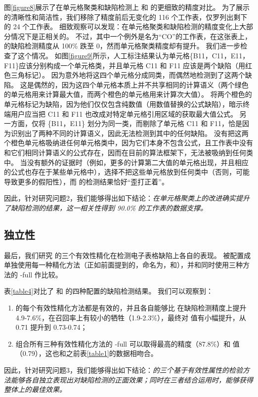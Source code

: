 图\ref{figure8}展示了在单元格聚类和缺陷检测上 \wa 和 \cu 的更细致的精度对比。
为了展示的清晰性和简洁性，我们移除了精度前后无变化的 116 个工作表，仅罗列出剩下的 24 个工作表。
细致观察可以发现：在单元格聚类和缺陷检测的精度变化上大部分情况下是正相关的。
不过，其中一个例外是名为“CO”的工作表，在这张表上，\wa 的缺陷检测精度从 100\% 跌至 0，然而单元格聚类精度却有提升。
我们进一步检查了这个情况。
如图\ref{figure9}所示，人工标注结果认为单元格\{B11，C11，E11，F11\}应该分别构成一个单元格类，并且单元格 C11 和 F11 应该是两个缺陷（用红色三角标记）。
\cu 因为意外地将这四个单元格分成同类，而偶然地检测到了这两个缺陷。
这是偶然的，因为这四个单元格本质上并不共享相同的计算语义（两个绿色的单元格用来计算最大值，而两个橙色的单元格用来计算次大值）。
\cu 将两个橙色的单元格标记为缺陷，因为他们仅仅包含纯数值（用数值替换的公式缺陷），暗示终端用户应当把 C11 和 F11 也改成对特定单元格引用区域的获取最大值公式。
另一方面，\wa 仅将 \{B11，E11\} 划分为同一类，而剔除了单元格 C11 和 F11，恰是因为识别出了两种不同的计算语义，因此无法检测到其中的任何缺陷。
\wa 没有把这两个橙色单元格吸纳进任何单元格类中，因为它们本身不包含公式，且工作表中没有和它们相同计算语义的公式存在，因而在目前的算法框架下，无法被吸纳到任何类中。
当没有额外的证据时（例如，更多的计算第二大值的单元格出现，并且相应的公式也存在于某些单元格中），\wa 选择不把这些单元格放到任何类中（否则，可能导致更多的假阳性），而 \cu 的检测结果恰好“歪打正着”。

因此，针对研究问题2，我们能够得出如下结论：\textit{\wa 在单元格聚类上的改进确实提升了缺陷检测的结果，这一相关性得到 90.0\% 的工作表的数据支撑。}

\subsection{独立性}

最后，我们研究 \wa 的三个有效性精化在检测电子表格缺陷上各自的表现。
\wa 被配置成单独使用每一种精化方法（正如前面提到的，命名为\wasc，\wamc 和\wawc ），并和同时使用三种方法的 \wa-full 作比较。

表\ref{table4}对比了 \cu 和 \wa 的四种配置的缺陷检测结果。
我们可以观察到：
\begin{enumerate}
    \item \wa 的每个有效性精化方法都是有效的，并且各自能够比 \cu 在缺陷检测精度上提升 4.9-7.6\%，在召回率上有较小的牺牲（1.9-2.3\%），最终对 \fmd 值有小幅提升，从 0.71 提升到 0.73-0.74；
    \item 组合所有三种有效性精化方法的 \wa-full 可以取得最高的精度（87.8\%）和 \fmd 值（0.79），这也和之前表\ref{table1}的数据相吻合。
\end{enumerate}

因此，针对研究问题3，我们能够得出如下结论：\textit{\wa 的三个基于有效性属性的检验方法能够各自独立表现出对缺陷检测的正面效果；同时在三者结合运用时，能够获得整体上的最佳效果。}